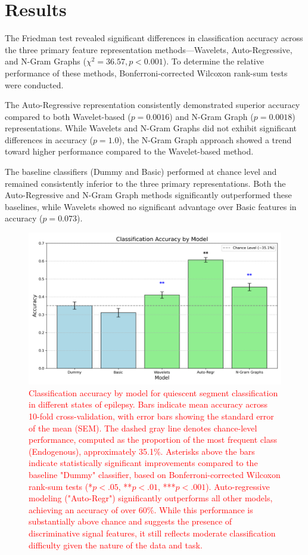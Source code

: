 \documentclass{article}
\begin{document}
\section{Results}
The Friedman test revealed significant differences in classification accuracy across the three primary feature representation methods—Wavelets, Auto-Regressive, and N-Gram Graphs (\(
\chi^2 = 36.57, p < 0.001
\)).
To determine the relative performance of these methods, Bonferroni-corrected Wilcoxon rank-sum tests were conducted.

The Auto-Regressive representation consistently demonstrated superior accuracy compared to both Wavelet-based (\(
p = 0.0016
\))
and N-Gram Graph (\(
p = 0.0018
\))
representations. While Wavelets and N-Gram Graphs did not exhibit significant differences in accuracy (\(
p = 1.0
\)),
the N-Gram Graph approach showed a trend toward higher performance compared to the Wavelet-based method.

The baseline classifiers (Dummy and Basic) performed at chance level and remained consistently inferior to the three primary representations. Both the Auto-Regressive and N-Gram Graph methods significantly outperformed these baselines, while Wavelets showed no significant advantage over Basic features in accuracy (\(
p = 0.073
\)).

\begin{figure}[htbp]
    \centering
    \includegraphics[width=\linewidth]{barplot_accuracies.png}
    \caption{\textcolor{red}{Classification accuracy by model for quiescent segment classification in different states of epilepsy. Bars indicate mean accuracy across 10-fold cross-validation, with error bars showing the standard error of the mean (SEM). The dashed gray line denotes chance-level performance, computed as the proportion of the most frequent class (Endogenous), approximately 35.1\%. Asterisks above the bars indicate statistically significant improvements compared to the baseline "Dummy" classifier, based on Bonferroni-corrected Wilcoxon rank-sum tests (*$p < .05$, **$p < .01$, ***$p < .001$). Auto-regressive modeling ("Auto-Regr") significantly outperforms all other models, achieving an accuracy of over 60\%. While this performance is substantially above chance and suggests the presence of discriminative signal features, it still reflects moderate classification difficulty given the nature of the data and task.}}
    \label{fig:accuracies}
\end{figure}
\end{document}
